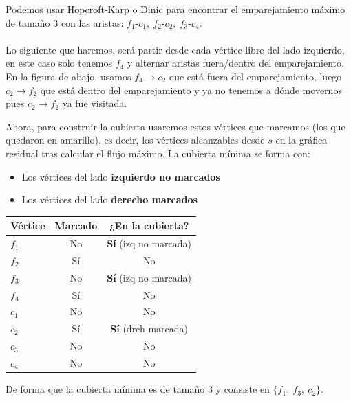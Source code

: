 Podemos usar Hopcroft-Karp o Dinic para encontrar el emparejamiento máximo de tamaño 3 con las aristas:
$f_1\text{-}c_1,\ f_2\text{-}c_2,\ f_3\text{-}c_4$.
\\\\
Lo siguiente que haremos, será partir desde cada vértice libre del lado izquierdo, en este caso solo tenemos $f_4$ y alternar aristas fuera/dentro del emparejamiento. En la figura de abajo, usamos $f_4\to c_2$ que está fuera del emparejamiento, luego $c_2\to f_2$ que está dentro del emparejamiento y ya no tenemos a dónde movernos pues $c_2\to f_2$ ya fue visitada.
 
\begin{figure}[H]
\centering
{}
\end{figure}

Ahora, para construir la cubierta usaremos estos vértices que marcamos (los que quedaron en amarillo), es decir, los vértices alcanzables desde $s$ en la gráfica residual tras calcular el flujo máximo. La cubierta mínima se forma con:
\begin{itemize}
    \item Los vértices del lado \textbf{izquierdo no marcados}
    \item Los vértices del lado \textbf{derecho marcados}
\end{itemize}
\begin{center}
\begin{tabular}{lcc}
\toprule
Vértice & Marcado & ¿En la cubierta? \\
\midrule
$f_1$ & No  & \textbf{Sí} (izq no marcada) \\
$f_2$ & Sí  & No \\
$f_3$ & No  & \textbf{Sí} (izq no marcada) \\
$f_4$ & Sí  & No \\
$c_1$ & No  & No \\
$c_2$ & Sí  & \textbf{Sí} (drch marcada) \\
$c_3$ & No  & No \\
$c_4$ & No  & No \\
\bottomrule
\end{tabular}
\end{center}
 De forma que la cubierta mínima es de tamaño $3$ y consiste en $\{f_1,\ f_3,\ c_2\}$.
 
